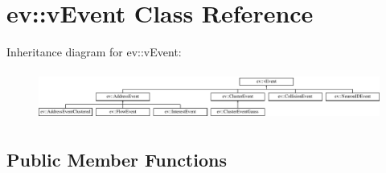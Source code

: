 \hypertarget{classev_1_1vEvent}{}\section{ev\+:\+:v\+Event Class Reference}
\label{classev_1_1vEvent}
Inheritance diagram for ev\+:\+:v\+Event\+:\begin{figure}[H]
\begin{center}
\leavevmode
\includegraphics[height=1.618497cm]{classev_1_1vEvent}
\end{center}
\end{figure}
\subsection*{Public Member Functions}
